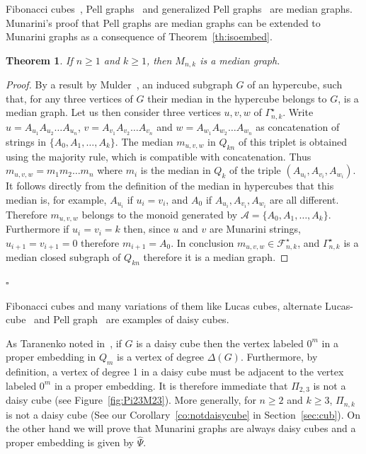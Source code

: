\documentclass[11pt]{article}
\newtheorem{theorem}{\bf Theorem}[section]
\newcommand{\qed}{\hfill $\square$ \bigskip}
\newcommand{\Fib}{{\mathcal F}}
\newcommand{\A}{{\mathcal A}}
\begin{document}
Fibonacci cubes~\cite[Theorem~10]{K-2005}, Pell graphs~\cite{M-2019} and generalized Pell graphs~\cite{IKT-2023} are median graphs.
Munarini's proof that Pell graphs are median graphs can be extended to Munarini graphs as a consequence of Theorem~\ref{th:isoembed}. 
\begin{theorem}
If $n\geq1$ and $k\geq1$, then $M_{n,k}$ is a median graph.
\end{theorem}
\begin{proof}
By a result by Mulder~\cite{M-1978}, an induced subgraph $G$ of an hypercube, such that, for any three vertices of $G $ their median in the hypercube belongs to $G$, is a median graph. Let us then consider three vertices $u,v,w$ of $\Gamma_{n,k}^\star$. Write $u=A_{u_1}A_{u_2}\ldots A_{u_n}$, $v=A_{v_1}A_{v_2}\ldots A_{v _n}$ and $w=A_{w_1}A_{w_2}\ldots A_{w _n}$ as concatenation of strings in $\{A_0,A_1,\ldots,A_k\}$. The median $m_{u,v,w}$ in $Q_{kn}$ of this triplet is obtained using the majority rule, which is compatible with concatenation. Thus $m_{u,v,w}=m_1m_2\ldots m_n $ where $m_i$ is the median in $Q_k$ of the triple $(A_{u_i},A_{v_i},A_{w_i})$. It follows directly from the definition of the median in hypercubes that this median is, for example, $A_{u_i}$  if $u_i=v_i$, and $A_0$ if $A_{u_i},A_{v_i},A_{w_i}$ are all different. Therefore $m_{u,v,w}$ belongs to  the monoid generated by $\A=\{A_0,A_1,\ldots,A_k\}$.
Furthermore if $u_i=v_i=k$ then, since $u$ and $v$ are Munarini strings, $u_{i+1}=v_{i+1}=0$ therefore $m_{i+1}=A_0$. In conclusion  $m_{u,v,w}\in \Fib_{n,k}^\star$,  and $\Gamma_{n,k}^\star$ is a median closed subgraph of $Q_{kn}$ therefore it is a median graph.
\end{proof}
\qed

Fibonacci cubes and many variations of them like Lucas cubes, alternate Lucas-cube~\cite{ESS-2021e} and  Pell graph~\cite[Theorem 9.68]{EKM-2023} are examples of daisy cubes.

As Taranenko noted in~\cite[Corollary 2.3]{T-2020a}, if $G$ is a daisy cube then the vertex labeled $0^m$ in a proper embedding in $Q_m$ is a vertex of degree $\Delta(G)$. Furthermore, by  definition, a vertex of degree 1 in a daisy cube must be adjacent to the vertex labeled $0^m$ in a proper embedding.  It is therefore immediate that $\Pi_{2,3}$ is not a daisy cube (see Figure~\ref{fig:Pi23M23}). More generally, for $n\geq2$ and $k\geq3$, $\Pi_{n,k}$ is not a daisy cube (See our Corollary~\ref{co:notdaisycube} in Section~\ref{sec:cub}). On the other hand we will prove  that Munarini graphs are always daisy cubes and a proper embedding is given by  $\widehat{\Psi}$.
\end{document}
